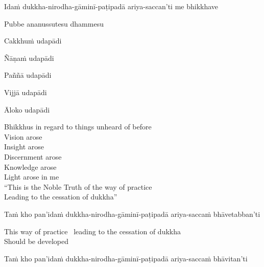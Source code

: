 \begin{pali-hang-first-line}
  Idaṁ dukkha-nirodha-gāminī-paṭipadā ariya-saccan'ti me bhikkhave
\end{pali-hang-first-line}
\begin{pali-hang-together}
  Pubbe ananussutesu dhammesu
\end{pali-hang-together}
\begin{pali-hang-together}
  Cakkhuṁ udapādi
\end{pali-hang-together}
\begin{pali-hang-together}
  Ñāṇaṁ udapādi
\end{pali-hang-together}
\ifafive\clearpage\fi
\begin{pali-hang-together}
  Paññā udapādi
\end{pali-hang-together}
\begin{pali-hang-together}
  Vijjā udapādi
\end{pali-hang-together}
\begin{pali-hang-together}
  Āloko udapādi
\end{pali-hang-together}

\begin{english-verses}
  Bhikkhus in regard to things unheard of before\\
  Vision arose\\
  Insight arose\\
  Discernment arose\\
  Knowledge arose\\
  Light arose in me\\
  ``This is the Noble Truth of the way of practice\\
  Leading to the cessation of dukkha''
\end{english-verses}

\ifninebythirteen\clearpage\fi

\begin{pali-hang}
  Taṁ kho pan'idaṁ dukkha-nirodha-gāminī-paṭipadā ariya-saccaṁ bhāvetabban'ti
\end{pali-hang}

\begin{english}
  This way of practice \breathmark\ leading to the cessation of dukkha\\
  Should be developed
\end{english}

\begin{pali-hang}
  Taṁ kho pan'idaṁ dukkha-nirodha-gāminī-paṭipadā ariya-saccaṁ bhāvitan'ti
\end{pali-hang}

